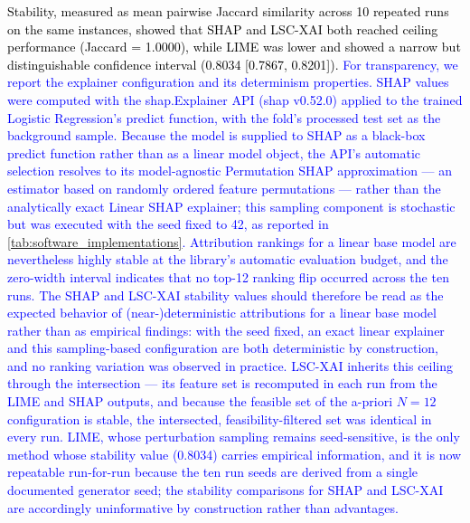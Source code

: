 \documentclass[a4paper,fleqn]{cas-sc}
\begin{document}
\textcolor{black}{Stability, measured as mean pairwise Jaccard similarity across 10 repeated runs on the same instances, showed that SHAP and LSC-XAI both reached ceiling performance (Jaccard = 1.0000), while LIME was lower and showed a narrow but distinguishable confidence interval (0.8034 [0.7867, 0.8201]). \textcolor{blue}{For transparency, we report the explainer configuration and its determinism properties. SHAP values were computed with the shap.Explainer API (shap v0.52.0) applied to the trained Logistic Regression's predict function, with the fold's processed test set as the background sample. Because the model is supplied to SHAP as a black-box predict function rather than as a linear model object, the API's automatic selection resolves to its model-agnostic Permutation SHAP approximation — an estimator based on randomly ordered feature permutations — rather than the analytically exact Linear SHAP explainer; this sampling component is stochastic but was executed with the seed fixed to 42, as reported in \cref{tab:software_implementations}. Attribution rankings for a linear base model are nevertheless highly stable at the library's automatic evaluation budget, and the zero-width interval indicates that no top-12 ranking flip occurred across the ten runs. The SHAP and LSC-XAI stability values should therefore be read as the expected behavior of (near-)deterministic attributions for a linear base model rather than as empirical findings: with the seed fixed, an exact linear explainer and this sampling-based configuration are both deterministic by construction, and no ranking variation was observed in practice. LSC-XAI inherits this ceiling through the intersection — its feature set is recomputed in each run from the LIME and SHAP outputs, and because the feasible set of the a-priori $N = 12$ configuration is stable, the intersected, feasibility-filtered set was identical in every run. LIME, whose perturbation sampling remains seed-sensitive, is the only method whose stability value (0.8034) carries empirical information, and it is now repeatable run-for-run because the ten run seeds are derived from a single documented generator seed; the stability comparisons for SHAP and LSC-XAI are accordingly uninformative by construction rather than advantages.}}
\end{document}
